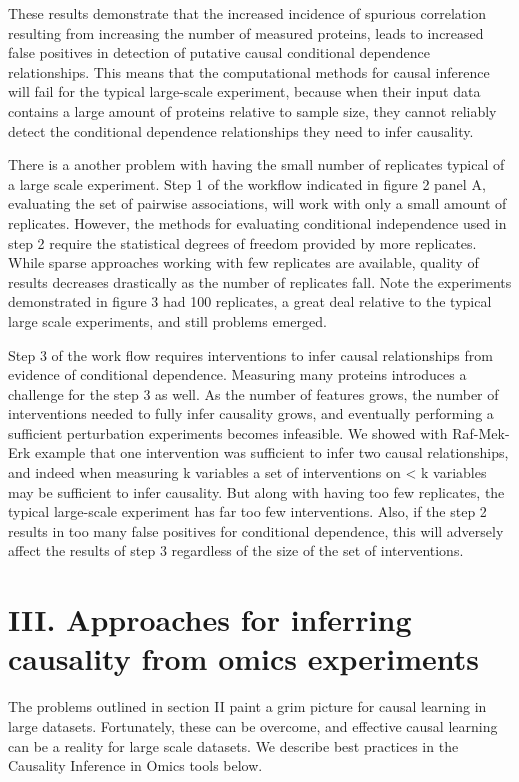 \documentclass[journal=jacsat,manuscript=article]{achemso}
\begin{document}
These results demonstrate that the increased incidence of spurious correlation resulting from increasing the number of measured proteins, leads to increased false positives in detection of putative causal conditional dependence relationships. This means that the computational methods for causal inference will fail for the typical large-scale experiment, because when their input data contains a large amount of proteins relative to sample size, they cannot reliably detect the conditional dependence relationships they need to infer causality.

There is a another problem with having the small number of replicates typical of a large scale experiment.  Step 1 of the workflow indicated in figure 2 panel A, evaluating the set of pairwise associations, will work with only a small amount of replicates.  However, the methods for evaluating conditional independence used in step 2 require the statistical degrees of freedom provided by more replicates.  While sparse approaches working with few replicates are available, quality of results decreases drastically as the number of replicates fall.  Note the experiments demonstrated in figure 3 had 100 replicates, a great deal relative to the typical large scale experiments, and still problems emerged.    

Step 3 of the work flow requires interventions to infer causal relationships from evidence of conditional dependence.  Measuring many proteins introduces a  challenge for the step 3 as well. As the number of features grows, the number of interventions needed to fully infer causality grows, and eventually performing a sufficient perturbation experiments becomes infeasible.   We showed with Raf-Mek-Erk example that one intervention was sufficient to infer two causal relationships, and indeed when measuring k variables a set of interventions on < k variables may be sufficient to infer causality.  But along with having too few replicates, the typical large-scale experiment has far too few interventions.  Also, if the step 2 results in too many false positives for conditional dependence, this will adversely affect the results of step 3 regardless of the size of the set of interventions.


\section{III. Approaches for inferring causality from omics experiments}

The problems outlined in section II paint a grim picture for causal learning in large datasets. Fortunately, these can be overcome, and effective causal learning can be a reality for large scale datasets.  We describe best practices  in the Causality Inference in Omics tools below.
\end{document}
